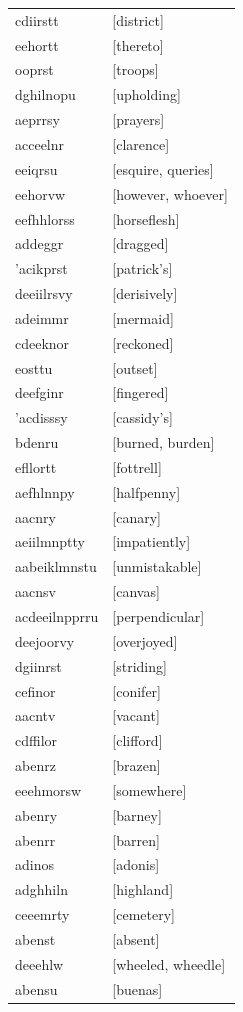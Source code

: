 \documentclass{article}
\begin{document}
\begin{tabular}{ll}
cdiirstt & [district] \\
eehortt & [thereto] \\
ooprst & [troops] \\
dghilnopu & [upholding] \\
aeprrsy & [prayers] \\
acceelnr & [clarence] \\
eeiqrsu & [esquire, queries] \\
eehorvw & [however, whoever] \\
eefhhlorss & [horseflesh] \\
addeggr & [dragged] \\
'acikprst & [patrick's] \\
deeiilrsvy & [derisively] \\
adeimmr & [mermaid] \\
cdeeknor & [reckoned] \\
eosttu & [outset] \\
deefginr & [fingered] \\
'acdisssy & [cassidy's] \\
bdenru & [burned, burden] \\
efllortt & [fottrell] \\
aefhlnnpy & [halfpenny] \\
aacnry & [canary] \\
aeiilmnptty & [impatiently] \\
aabeiklmnstu & [unmistakable] \\
aacnsv & [canvas] \\
acdeeilnpprru & [perpendicular] \\
deejoorvy & [overjoyed] \\
dgiinrst & [striding] \\
cefinor & [conifer] \\
aacntv & [vacant] \\
cdffilor & [clifford] \\
abenrz & [brazen] \\
eeehmorsw & [somewhere] \\
abenry & [barney] \\
abenrr & [barren] \\
adinos & [adonis] \\
adghhiln & [highland] \\
ceeemrty & [cemetery] \\
abenst & [absent] \\
deeehlw & [wheeled, wheedle] \\
abensu & [buenas] \\

\end{tabular}
\end{document}
